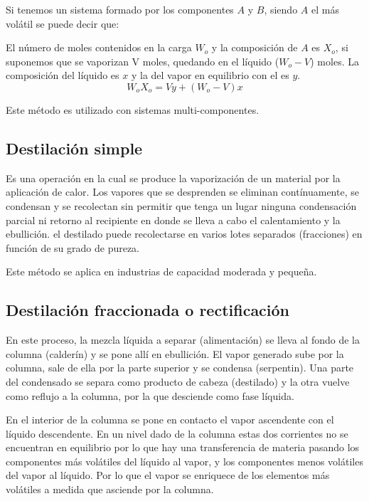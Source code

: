 \documentclass[11pt,openany]{book}
\begin{document}
Si tenemos un sistema formado por los componentes $A$ y $B$, siendo $A$ el más volátil se puede decir que:

El número de moles contenidos en la carga $W_o$ y la composición de $A$ es $X_o$, si suponemos que se 
vaporizan V moles, quedando en el líquido ($W_o - V$) moles. La composición del líquido es $x$ y la del 
vapor en equilibrio con el es $y$.
\begin{equation}W_o X_o = V y +(W_o -V) x\end{equation}


Este método es utilizado con sistemas multi-componentes.

\subsection {Destilación simple}

Es una operación en la cual se produce la vaporización de un material por la aplicación de calor. Los 
vapores que se desprenden se eliminan contínuamente, se condensan y se recolectan sin permitir 
que tenga un lugar ninguna condensación parcial ni retorno al recipiente en donde se lleva a cabo 
el calentamiento y la ebullición. el destilado puede recolectarse en varios lotes separados
 (fracciones) en función de su grado de pureza.

 Este método se aplica en industrias de capacidad moderada y pequeña.

 \subsection{Destilación fraccionada o rectificación}

En este proceso, la mezcla líquida a separar (alimentación) se lleva al fondo de la columna (calderín) y 
se pone allí en ebullición. El vapor generado sube por la columna, sale de ella por la parte superior y 
se condensa (serpentin). Una parte del condensado se separa como producto de cabeza (destilado) y la otra 
vuelve como reflujo a la columna, por la que desciende como fase líquida.

En el interior de la columna se pone en contacto el vapor ascendente con el líquido descendente. 
En un nivel dado de la columna estas dos corrientes no se encuentran en equilibrio por lo que hay 
una transferencia de materia pasando los componentes más volátiles del líquido al vapor, y los 
componentes menos volátiles del vapor al líquido. Por lo que el vapor se enriquece de los 
elementos más volátiles a medida que asciende por la columna.
\end{document}
